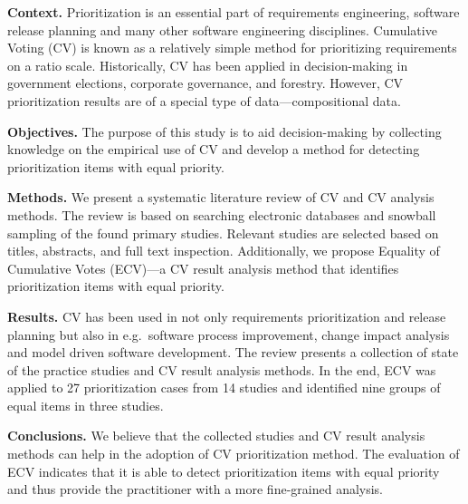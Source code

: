 
\textbf{Context.}
Prioritization is an essential part of requirements engineering, software release planning and many other software engineering disciplines.
Cumulative Voting (CV) is known as a relatively simple method for prioritizing requirements on a ratio scale.
Historically, CV has been applied in decision-making in government elections, corporate governance, and forestry.
However, CV prioritization results are of a special type of data---compositional data.

\textbf{Objectives.}
The purpose of this study is to aid decision-making by collecting knowledge on the empirical use of CV and develop a method for detecting prioritization items with equal priority.

\textbf{Methods.}
We present a systematic literature review of CV and CV analysis methods.
The review is based on searching electronic databases and snowball sampling of the found primary studies.
Relevant studies are selected based on titles, abstracts, and full text inspection.
Additionally, we propose Equality of Cumulative Votes (ECV)---a CV result analysis method that identifies prioritization items with equal priority.

\textbf{Results.}
CV has been used in not only requirements prioritization and release planning but also in e.g.\ software process improvement, change impact analysis and model driven software development.
The review presents a collection of state of the practice studies and CV result analysis methods.
In the end, ECV was applied to 27 prioritization cases from 14 studies and identified nine groups of equal items in three studies.

\textbf{Conclusions.}
We believe that the collected studies and CV result analysis methods can help in the adoption of CV prioritization method.
The evaluation of ECV indicates that it is able to detect prioritization items with equal priority and thus provide the practitioner with a more fine-grained analysis.